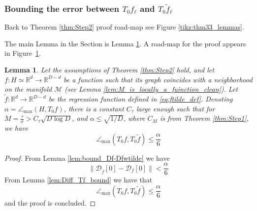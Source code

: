 \documentclass[12pt]{article}
\newtheorem{Lemma}[Theorem]{Lemma}
\theoremstyle{remark}
\newcommand{\RR}{\mathbb{R}}
\newcommand{\MM}{\mathcal{M}}
\newcommand{\DD}{\mathcal{D}}
\newcommand{\wtilde}[1]{\widetilde{#1}}
\newcommand{\maxangle}{\angle_{\max}}
\newcommand{\stau}{\tau}
\newcommand{\sM}{{M}}
\begin{document}
\begin{appendices}
\subsubsection{Bounding the error between $T_0 {f_\ell}$ and $T_0\wtilde{f}_\ell$}\label{sec:Tf_Tf_tilde_err}
\usetikzlibrary{calc}

\begin{figure}[omitted: a diagram of this paper's results, not reproduced here]\label{tikz:lemTf-Tftilde_lemmas}\end{figure}



Back to Theorem \ref{thm:Step2} proof road-map see Figure \ref{tikz:thm33_lemmas}.


The main Lemma in the Section is Lemma \ref{lem:Tf_TtildeF_D}. A road-map for the proof appears in Figure~\ref{tikz:lemTf-Tftilde_lemmas}.

\begin{Lemma}\label{lem:Tf_TtildeF_D}
    Let the assumptions of Theorem \ref{thm:Step2} hold, and let $ f:H\simeq\RR^d\to\RR^{D-d} $ be a function such that its graph coincides with a neighborhood on the manifold $\MM$ (see Lemma \ref{lem:M_is_locally_a_fuinction_clean}). Let $\wtilde f:\RR^d\to\RR^{D-d} $ be the regression function defined in \eqref{eq:ftilde_def}. Denoting $\alpha = \maxangle(H, T_0 f)$, there is a constant $C_\stau$ large enough such that for $M = \frac{\tau}{\sigma}>C_\stau\sqrt{D \log D}$, and $\alpha \leq \sqrt{1/D}$, where $C_\sM$ is from Theorem \ref{thm:Step1}, we have 
    \[
	\maxangle(T_0 f, T_0 {\wtilde{f}}) 
	\leq  
	 \frac{\alpha}{6} 
	\]
\end{Lemma}
\begin{proof}
From Lemma \ref{lem:bound_Df-Dfwtilde} we have 
\[
\|\DD_{\wtilde{f}}[0] - \DD_f[0]\| < \frac{\alpha}{6}
\]
From Lemma \ref{lem:Diff_Tf_bound} we have that 
    \[
	\maxangle(T_0 f, T_0 {\wtilde{f}}) 
	\leq   \frac{\alpha}{6}
	\]
	and the proof is concluded. 
\end{proof}



\end{appendices}
\end{document}
